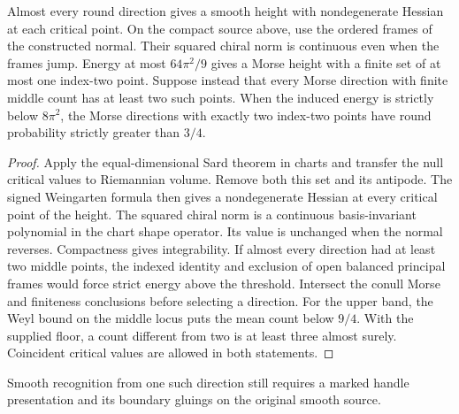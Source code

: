 \begin{theorem}
\label{thm:ed03-morse-threshold}
\leanok
Almost every round direction gives a smooth height with nondegenerate
Hessian at each critical point. On the compact source above, use the
ordered frames of the constructed normal. Their squared chiral norm is
continuous even when the frames jump. Energy at most $64\pi^2/9$
gives a Morse height with a finite set of at most one index-two point.
Suppose instead that every Morse direction with finite middle count has
at least two such points. When the induced energy is strictly below
$8\pi^2$, the Morse directions with exactly two index-two points
have round probability strictly greater than $3/4$.
\end{theorem}
\begin{proof}
\leanok
Apply the equal-dimensional Sard theorem in charts and transfer the null
critical values to Riemannian volume. Remove both this set and its antipode.
The signed Weingarten formula then gives a nondegenerate Hessian at
every critical point of the height. The squared chiral norm is a continuous
basis-invariant polynomial in the chart shape operator. Its value is
unchanged when the normal reverses. Compactness gives integrability.
If almost every direction had at
least two middle points, the indexed identity and exclusion of open
balanced principal frames would force strict energy above the threshold.
Intersect the conull Morse and finiteness conclusions before selecting
a direction. For the upper band, the Weyl bound on the middle locus
puts the mean count below $9/4$. With the supplied floor, a count
different from two is at least three almost surely. Coincident critical
values are allowed in both statements.
\end{proof}
Smooth recognition from one such direction still requires a marked handle
presentation and its boundary gluings on the original smooth source.

